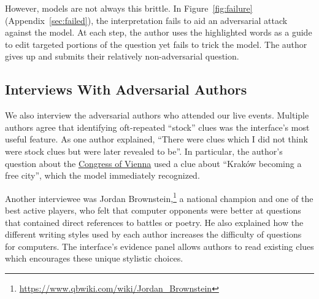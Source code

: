However, models are not always this brittle. In
Figure~\ref{fig:failure} (Appendix~\ref{sec:failed}), the interpretation fails to aid an
adversarial attack against the  model. At each step, the
author uses the highlighted words as a guide to edit targeted portions
of the question yet fails to trick the model. The author gives up and
submits their relatively non-adversarial question.


\subsection{Interviews With Adversarial Authors}

We also interview the adversarial authors who attended our live events. Multiple authors agree that identifying oft-repeated ``stock'' clues was the interface's most useful feature. As one author explained, ``There were clues which I did not think were stock clues but were later revealed to be''. In particular, the author's question about the \underline{Congress of Vienna} used a clue about ``Krak\'ow becoming a free city'', which the model immediately recognized.

Another interviewee was Jordan Brownstein,\footnote{\url{https://www.qbwiki.com/wiki/Jordan_Brownstein}} a national \qb{} champion and one of the best active players, who felt that computer opponents were better at questions that contained direct references to battles or poetry. He also explained how the different writing styles used by each \qb{} author increases the difficulty of questions for computers. The interface's evidence panel allows authors to read existing clues which encourages these unique stylistic choices.
